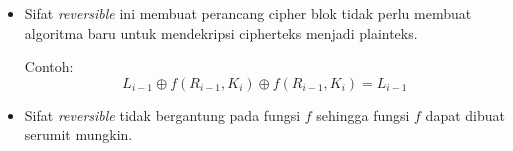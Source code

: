 \documentclass{article}
\begin{document}

\begin{itemize}
  \item Sifat \textit{reversible} ini membuat perancang cipher blok tidak perlu membuat algoritma baru untuk mendekripsi cipherteks menjadi plainteks.

  Contoh: \[ L_{i-1} \oplus f(R_{i-1}, K_i) \oplus f(R_{i-1}, K_i) = L_{i-1} \]

  \item Sifat \textit{reversible} tidak bergantung pada fungsi $f$ sehingga fungsi $f$ dapat dibuat serumit mungkin.
\end{itemize}
\end{document}
